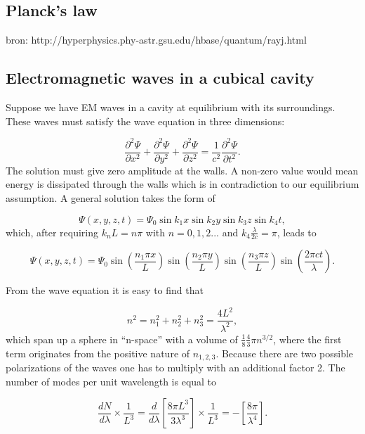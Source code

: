 \begin{appendices}
\chapter{Planck's law}
\label{ch:planck}
bron: http://hyperphysics.phy-astr.gsu.edu/hbase/quantum/rayj.html
\section{Electromagnetic waves in a cubical cavity}
Suppose we have EM waves in a cavity at equilibrium with its surroundings. These waves must satisfy the wave equation in three dimensions:

\begin{equation}
\frac{\partial^2 \Psi}{\partial x^2} + \frac{\partial^2 \Psi}{\partial y^2} + \frac{\partial^2 \Psi}{\partial z^2} = \frac{1}{c^2} \frac{\partial^2 \Psi}{\partial t^2}.
\end{equation}
The solution must give zero amplitude at the walls. A non-zero value would mean energy is dissipated through the walls which is in contradiction to our equilibrium assumption. A general solution takes the form of

\begin{equation}
\Psi(x,y,z,t) = \Psi_0 \sin{k_1x} \sin{k_2y} \sin{k_3z} \sin{k_4 t},
\end{equation}
which, after requiring $k_n L = n \pi$ with $n=0,1,2...$ and $k_4 \frac{\lambda}{2c} = \pi$, leads to

\begin{equation}
\Psi(x,y,z,t) = \Psi_0 \sin{\left(\frac{n_1 \pi x}{L}\right)} \sin{\left(\frac{n_2 \pi y}{L}\right)} \sin{\left(\frac{n_3 \pi z}{L}\right)} \sin{\left(\frac{2\pi ct}{\lambda}\right)}.
\end{equation}

From the wave equation it is easy to find that

\begin{equation}
\label{eq:n}
n^2 = n_1^2 + n_2^2 + n_3^2 = \frac{4L^2}{\lambda^2},
\end{equation}
which span up a sphere in ``n-space'' with a volume of $\frac{1}{8}\frac{4}{3}\pi n^{3/2}$, where the first term originates from the positive nature of $n_{1,2,3}$. Because there are two possible polarizations of the waves one has to multiply with an additional factor 2. The number of modes per unit wavelength is equal to

\begin{equation}
\frac{dN}{d\lambda} \times \frac{1}{L^3} = \frac{d}{d\lambda}\left[\frac{8\pi L^3}{3\lambda^3}\right]  \times \frac{1}{L^3} = - \left[\frac{8\pi}{\lambda^4}\right].
\end{equation}

\end{appendices}
